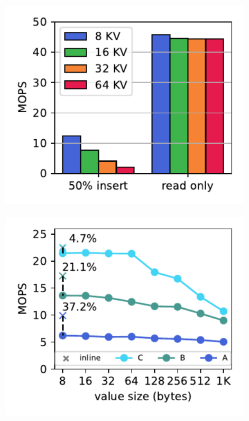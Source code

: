 \begin{figure}[t]
\begin{subfigure}{\subfigwidth}
    \end{subfigure}
    \begin{subfigure}{\subfigwidth}
      \includegraphics[width=0.99\linewidth]{fig/entry_size.pdf}
          \end{subfigure}
    \begin{subfigure}{\subfigwidth}
      \includegraphics[width=0.99\linewidth]{fig/extent.pdf}

\end{subfigure}
\end{figure}
